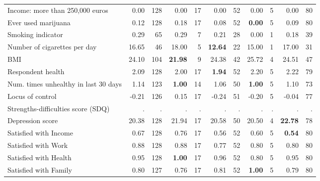 \begin{tabular}{l r r r r r r r r r r}
Income: more than 250,000 euros &      0.00 &       128 &      0.00 &        17 &      0.00 &        52 &      0.00 &         5 &      0.00 &        80 \\
Ever used marijuana &      0.12 &       128 &      0.18 &        17 &      0.08 &        52 & \textbf{     0.00} &         5 &      0.09 &        80 \\
Smoking indicator &      0.29 &        65 &      0.29 &         7 &      0.21 &        28 &      0.00 &         1 &      0.18 &        39 \\
Number of cigarettes per day &     16.65 &        46 &     18.00 &         5 & \textbf{    12.64} &        22 &     15.00 &         1 &     17.00 &        31 \\
BMI &     24.10 &       104 & \textbf{    21.98} &         9 &     24.38 &        42 &     25.72 &         4 &     24.51 &        47 \\
Respondent health &      2.09 &       128 &      2.00 &        17 & \textbf{     1.94} &        52 &      2.20 &         5 &      2.22 &        79 \\
Num. times unhealthy in last 30 days &      1.14 &       123 & \textbf{     1.00} &        14 &      1.06 &        50 & \textbf{     1.00} &         5 &      1.10 &        73 \\
Locus of control &     -0.21 &       126 &      0.15 &        17 &     -0.24 &        51 &     -0.20 &         5 &     -0.04 &        77 \\
Strengths-difficulties score (SDQ) &         . & . &         . & . &         . & . &         . & . &         . & . \\
Depression score &     20.38 &       128 &     21.94 &        17 &     20.58 &        50 &     20.50 &         4 & \textbf{    22.78} &        78 \\
Satisfied with Income &      0.67 &       128 &      0.76 &        17 &      0.56 &        52 &      0.60 &         5 & \textbf{     0.54} &        80 \\
Satisfied with Work &      0.88 &       128 &      0.88 &        17 &      0.77 &        52 &      0.80 &         5 &      0.80 &        80 \\
Satisfied with Health &      0.95 &       128 & \textbf{     1.00} &        17 &      0.96 &        52 &      0.80 &         5 &      0.95 &        80 \\
Satisfied with Family &      0.80 &       127 &      0.76 &        17 &      0.81 &        52 & \textbf{     1.00} &         5 &      0.79 &        80 \\
\bottomrule
\end{tabular}
